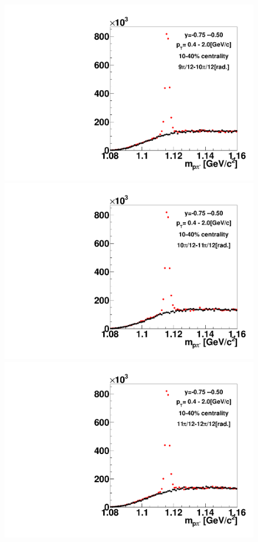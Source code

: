 \begin{figure}[h]
\includegraphics[width=0.14\linewidth]{chapterX/fig/ld_v2_sig/kf_ptslice0_cent1_ld_flow_phi10_rap4_check.pdf}
\includegraphics[width=0.14\linewidth]{chapterX/fig/ld_v2_sig/kf_ptslice0_cent1_ld_flow_phi11_rap4_check.pdf}
\includegraphics[width=0.14\linewidth]{chapterX/fig/ld_v2_sig/kf_ptslice0_cent1_ld_flow_phi12_rap4_check.pdf}


\end{figure}
